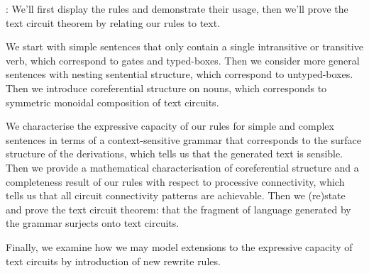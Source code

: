 : We'll first display the rules and demonstrate their usage, then we'll prove the text circuit theorem by relating our rules to text.

 We start with simple sentences that only contain a single intransitive or transitive verb, which correspond to gates and typed-boxes. Then we consider more general sentences with nesting sentential structure, which correspond to untyped-boxes. Then we introduce coreferential structure on nouns, which corresponds to symmetric monoidal composition of text circuits.

 We characterise the expressive capacity of our rules for simple and complex sentences in terms of a context-sensitive grammar that corresponds to the surface structure of the derivations, which tells us that the generated text is sensible. Then we provide a mathematical characterisation of coreferential structure and a completeness result of our rules with respect to processive connectivity, which tells us that all circuit connectivity patterns are achievable. Then we (re)state and prove the text circuit theorem: that the fragment of language generated by the grammar surjects onto text circuits.

 Finally, we examine how we may model extensions to the expressive capacity of text circuits by introduction of new rewrite rules.

\clearpage

